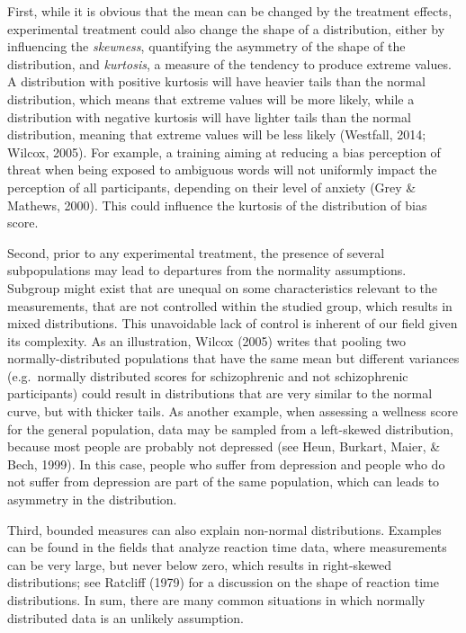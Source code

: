\documentclass[man,floatsintext]{apa6}
\begin{document}
First, while it is obvious that the mean can be changed by the treatment effects, experimental treatment could also change the shape of a distribution, either by influencing the \emph{skewness}, quantifying the asymmetry of the shape of the distribution, and \emph{kurtosis}, a measure of the tendency to produce extreme values. A distribution with positive kurtosis will have heavier tails than the normal distribution, which means that extreme values will be more likely, while a distribution with negative kurtosis will have lighter tails than the normal distribution, meaning that extreme values will be less likely (Westfall, 2014; Wilcox, 2005). For example, a training aiming at reducing a bias perception of threat when being exposed to ambiguous words will not uniformly impact the perception of all participants, depending on their level of anxiety (Grey \& Mathews, 2000). This could influence the kurtosis of the distribution of bias score.

Second, prior to any experimental treatment, the presence of several subpopulations may lead to departures from the normality assumptions. Subgroup might exist that are unequal on some characteristics relevant to the measurements, that are not controlled within the studied group, which results in mixed distributions. This unavoidable lack of control is inherent of our field given its complexity. As an illustration, Wilcox (2005) writes that pooling two normally-distributed populations that have the same mean but different variances (e.g.~normally distributed scores for schizophrenic and not schizophrenic participants) could result in distributions that are very similar to the normal curve, but with thicker tails. As another example, when assessing a wellness score for the general population, data may be sampled from a left-skewed distribution, because most people are probably not depressed (see Heun, Burkart, Maier, \& Bech, 1999). In this case, people who suffer from depression and people who do not suffer from depression are part of the same population, which can leads to asymmetry in the distribution.

Third, bounded measures can also explain non-normal distributions. Examples can be found in the fields that analyze reaction time data, where measurements can be very large, but never below zero, which results in right-skewed distributions; see Ratcliff (1979) for a discussion on the shape of reaction time distributions. In sum, there are many common situations in which normally distributed data is an unlikely assumption.
\end{document}

